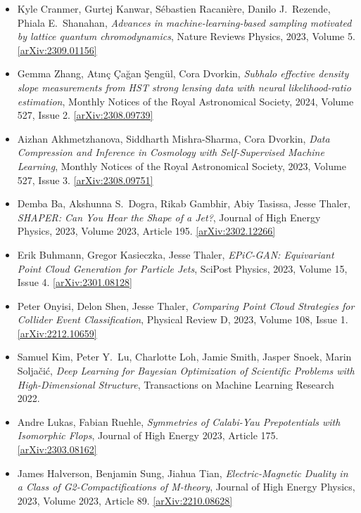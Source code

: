 \begin{itemize}
\item Kyle Cranmer, Gurtej Kanwar, Sébastien Racanière, Danilo J.\  Rezende, Phiala E.\  Shanahan, \textit{Advances in machine-learning-based sampling motivated by lattice quantum chromodynamics}, Nature Reviews Physics, 2023, Volume 5. \href{https://arxiv.org/abs/2309.01156}{[arXiv:2309.01156]} 
\item Gemma Zhang, Atınç Çağan Şengül, Cora Dvorkin, \textit{Subhalo effective density slope measurements from HST strong lensing data with neural likelihood-ratio estimation}, Monthly Notices of the Royal Astronomical Society, 2024, Volume 527, Issue 2. \href{https://arxiv.org/abs/2308.09739}{[arXiv:2308.09739]} 
\item Aizhan Akhmetzhanova, Siddharth Mishra-Sharma, Cora Dvorkin, \textit{Data Compression and Inference in Cosmology with Self-Supervised Machine Learning}, Monthly Notices of the Royal Astronomical Society, 2023, Volume 527, Issue 3. \href{https://arxiv.org/abs/2308.09751}{[arXiv:2308.09751]} 
\item Demba Ba, Akshunna S.\  Dogra, Rikab Gambhir, Abiy Tasissa, Jesse Thaler, \textit{SHAPER: Can You Hear the Shape of a Jet?}, Journal of High Energy Physics, 2023, Volume 2023, Article 195. \href{https://arxiv.org/abs/2302.12266}{[arXiv:2302.12266]} 
\item Erik Buhmann, Gregor Kasieczka, Jesse Thaler, \textit{EPiC-GAN: Equivariant Point Cloud Generation for Particle Jets}, SciPost Physics, 2023, Volume 15, Issue 4. \href{https://arxiv.org/abs/2301.08128}{[arXiv:2301.08128]} 
\item Peter Onyisi, Delon Shen, Jesse Thaler, \textit{Comparing Point Cloud Strategies for Collider Event Classification}, Physical Review D, 2023, Volume 108, Issue 1. \href{https://arxiv.org/abs/2212.10659}{[arXiv:2212.10659]} 
\item Samuel Kim, Peter Y.\  Lu, Charlotte Loh, Jamie Smith, Jasper Snoek, Marin Soljačić, \textit{Deep Learning for Bayesian Optimization of Scientific Problems with High-Dimensional Structure}, Transactions on Machine Learning Research 2022. 
\item Andre Lukas, Fabian Ruehle, \textit{Symmetries of Calabi-Yau Prepotentials with Isomorphic Flops}, Journal of High Energy 2023, Article 175. \href{https://arxiv.org/abs/2303.08162}{[arXiv:2303.08162]} 
\item James Halverson, Benjamin Sung, Jiahua Tian, \textit{Electric-Magnetic Duality in a Class of G2-Compactifications of M-theory}, Journal of High Energy Physics, 2023, Volume 2023, Article 89. \href{https://arxiv.org/abs/2210.08628}{[arXiv:2210.08628]} 

\end{itemize}

